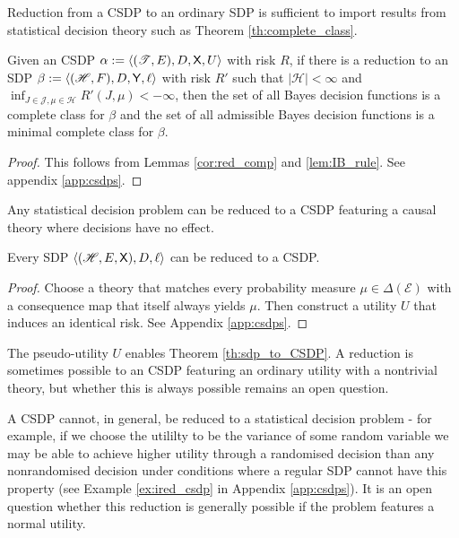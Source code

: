 Reduction from a CSDP to an ordinary SDP is sufficient to import results from statistical decision theory such as Theorem \ref{th:complete_class}.


\begin{theorem}\label{th:complete_class}
Given an CSDP $\alpha:=\langle (\mathscr{T},E),D,\mathsf{X},U\rangle$ with risk $R$, if there is a reduction to an SDP $\beta:=\langle (\mathscr{H},F),D,\mathsf{Y},\ell \rangle$ with risk $R'$ such that $|\mathscr{H}|<\infty$ and $\inf_{J\in\mathscr{J},\mu\in\mathscr{H}} R'(J,\mu)<-\infty$, then the set of all Bayes decision functions is a complete class for $\beta$ and the set of all admissible Bayes decision functions is a minimal complete class for $\beta$.
\end{theorem}

\begin{proof}
This follows from Lemmas \ref{cor:red_comp} and \ref{lem:IB_rule}. See appendix \ref{app:csdps}.
\end{proof}

Any statistical decision problem can be reduced to a CSDP featuring a causal theory where decisions have no effect.



\begin{theorem}\label{th:sdp_to_CSDP}
Every SDP $\langle (\mathscr{H},E,\mathsf{X}),D,\ell\rangle$ can be reduced to a CSDP.
\end{theorem}
\begin{proof}
Choose a theory that matches every probability measure $\mu\in\Delta(\mathcal{E})$ with a consequence map that itself always yields $\mu$. Then construct a utility $U$ that induces an identical risk. See Appendix \ref{app:csdps}.
\end{proof}

The pseudo-utility $U$ enables Theorem \ref{th:sdp_to_CSDP}. A reduction is sometimes possible to an CSDP featuring an ordinary utility with a nontrivial theory, but whether this is always possible remains an open question.

A CSDP cannot, in general, be reduced to a statistical decision problem - for example, if we choose the utililty to be the variance of some random variable we may be able to achieve higher utility through a randomised decision than any nonrandomised decision under conditions where a regular SDP cannot have this property (see Example \ref{ex:ired_csdp} in Appendix \ref{app:csdps}). It is an open question whether this reduction is generally possible if the problem features a normal utility.

